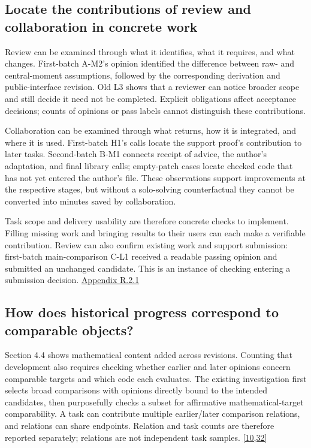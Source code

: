 \subsection[Locate the contributions of review and collaboration in concrete work]{\texorpdfstring{\protect\hypertarget{section-6-2}{}Locate the contributions of review and collaboration in concrete work}{Locate the contributions of review and collaboration in concrete work}}
Review can be examined through what it identifies, what it requires, and what changes. First-batch A-M2's opinion identified the difference between raw- and central-moment assumptions, followed by the corresponding derivation and public-interface revision. Old L3 shows that a reviewer can notice broader scope and still decide it need not be completed. Explicit obligations affect acceptance decisions; counts of opinions or pass labels cannot distinguish these contributions.

Collaboration can be examined through what returns, how it is integrated, and where it is used. First-batch H1's calls locate the support proof's contribution to later tasks. Second-batch B-M1 connects receipt of advice, the author's adaptation, and final library calls; empty-patch cases locate checked code that has not yet entered the author's file. These observations support improvements at the respective stages, but without a solo-solving counterfactual they cannot be converted into minutes saved by collaboration.

Task scope and delivery usability are therefore concrete checks to implement. Filling missing work and bringing results to their users can each make a verifiable contribution. Review can also confirm existing work and support submission: first-batch main-comparison C-L1 received a readable passing opinion and submitted an unchanged candidate. This is an instance of checking entering a submission decision. \href{en-appendix.pdf\#r2-1}{Appendix R.2.1}

\subsection[How does historical progress correspond to comparable objects?]{\texorpdfstring{\protect\hypertarget{section-6-3}{}How does historical progress correspond to comparable objects?}{How does historical progress correspond to comparable objects?}}
Section 4.4 shows mathematical content added across revisions. Counting that development also requires checking whether earlier and later opinions concern comparable targets and which code each evaluates. The existing investigation first selects broad comparisons with opinions directly bound to the intended candidates, then purposefully checks a subset for affirmative mathematical-target comparability. A task can contribute multiple earlier/later comparison relations, and relations can share endpoints. Relation and task counts are therefore reported separately; relations are not independent task samples. \hyperlink{ref-10}{\mbox{[10,32]}}

